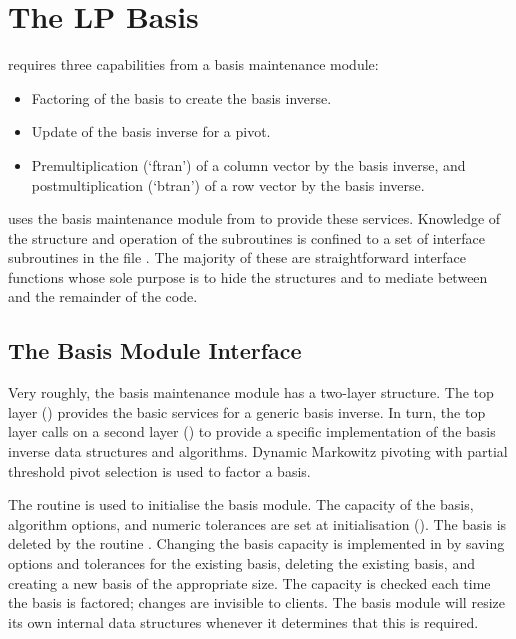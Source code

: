 \section{The LP Basis}
\label{sec:LPBasis}

\dylp requires three capabilities from a basis maintenance module:
\begin{itemize}
\item	Factoring of the basis to create the basis inverse.

\item	Update of the basis inverse for a pivot.

\item	Premultiplication (`ftran') of a column vector by the basis inverse,
	and postmultiplication (`btran') of a row vector by the basis inverse.
\end{itemize}
\dylp uses the basis maintenance module from \glpk to provide these services.
Knowledge of the structure and operation of the \glpk subroutines is
confined to a set of interface subroutines in the file .
The majority of these are straightforward interface functions whose sole
purpose is to hide the \glpk structures and to mediate between \glpk and the
remainder of the code.

\subsection{The \glpk Basis Module Interface}
\label{sec:GLPKBasisModule}

Very roughly, the \glpk basis maintenance module has a two-layer structure.
The top layer () provides the basic services for a
generic basis inverse.
In turn, the top layer calls on a second layer () to
provide a specific
implementation of the basis inverse data structures and algorithms.
Dynamic Markowitz pivoting with partial threshold pivot selection is
used to factor a basis.

The routine  is used to initialise the basis module.
The capacity of the basis, algorithm options, and numeric tolerances are
set at initialisation (\vid {}).
The basis is deleted by the routine .
Changing the basis capacity is implemented in \dylp by saving options and
tolerances for the existing basis, deleting the existing basis,
and creating a new basis of the appropriate size.
The capacity is checked each time the basis is factored; changes are
invisible to clients.
The \glpk basis module will resize its own internal data structures whenever
it determines that this is required.

